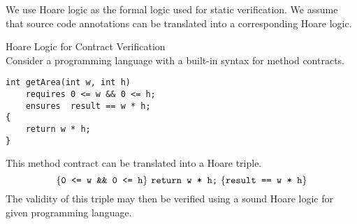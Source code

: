 We use Hoare logic \cite{hoare1969axiomatic} as the formal logic used for static verification.
We assume that source code annotations can be translated into a corresponding Hoare logic.

\begin{example}{Hoare Logic for Contract Verification}~\\
    Consider a programming language with a built-in syntax for method contracts.
    \begin{lstlisting}
int getArea(int w, int h)
    requires 0 <= w && 0 <= h;
    ensures  result == w * h;
{
    return w * h;
}
    \end{lstlisting}
    This method contract can be translated into a Hoare triple.
    \begin{displaymath}
    \{{\textup{\texttt{0 <= w \&\& 0 <= h}}}\} ~{\textup{\texttt{return w * h;}}}~ \{{\textup{\texttt{result == w * h}}}\}
    \end{displaymath}
    The validity of this triple may then be verified using a sound Hoare logic for given programming language.
\end{example}
